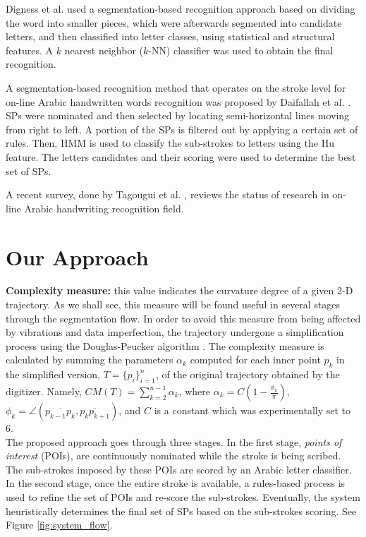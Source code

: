 \documentclass[10pt, conference, compsocconf]{IEEEtran}
\begin{document}
Digness et al. \cite{Dinges2011} used a segmentation-based recognition approach based on dividing the word into smaller pieces, which were afterwards segmented into candidate letters, and then classified into letter classes, using statistical and structural features. 
A $k$ nearest neighbor ($k$-NN) classifier was used to obtain the final recognition.

A segmentation-based recognition method that operates on the stroke level for on-line Arabic handwritten words recognition was proposed by Daifallah et al. \cite{daifallah2009recognition}. 
SPs were nominated and then selected by locating semi-horizontal lines moving from right to left. 
A portion of the SPs is filtered out by applying a certain set of rules. 
Then, HMM is used to classify the sub-strokes to letters using the Hu feature. 
The letters candidates and their scoring were used to determine the best set of SPs.

A recent survey, done by Tagougui et al. \cite{tagougui2013online}, reviews the status of research in on-line Arabic handwriting recognition field. 

\section{Our Approach}
\label{sec:approach}

\textbf{Complexity measure:} this value indicates the curvature degree of a given 2-D trajectory. 
As we shall see, this measure will be found useful in several stages through the segmentation flow.
In order to avoid this measure from being affected by vibrations and data imperfection, the trajectory undergone a simplification process using the Douglas-Peucker algorithm \cite{douglas1973algorithms}.
The complexity measure is calculated by summing the parameters $\alpha_{k}$ computed for each inner point $p_k$ in the simplified version, $T=\{p_i\}_{i=1}^{n}$, of the original trajectory obtained by the digitizer.
Namely, $CM(T)=\sum_{k=2}^{n-1}{\alpha_k}$, where $\alpha_{k}=C(1-\frac{\phi_k}{\pi})$, $\phi_k=\angle(\overline{p_{k-1}p_{k}},\overline{p_{k}p_{k+1}})$, and $C$ is a constant which was experimentally set to 6.\\

The proposed approach goes through three stages. 
In the first stage, \emph{points of interest} (POIs), are continuously nominated while the stroke is being scribed.
The sub-strokes imposed by these POIs are scored by an Arabic letter classifier. 
In the second stage, once the entire stroke is available, a rules-based process is used to refine the set of POIs and re-score the sub-strokes. 
Eventually, the system heuristically determines the final set of SPs based on the sub-strokes scoring. See Figure \ref{fig:system_flow}. 
\end{document}

